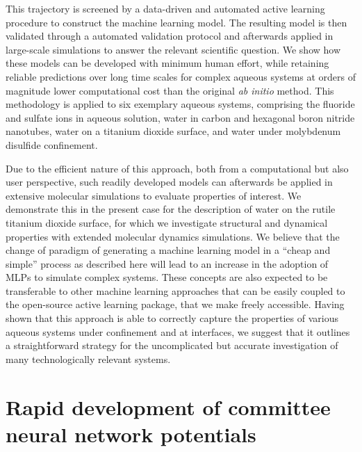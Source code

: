 \documentclass[aip,jcp,amsmath,amssymb,floatfix,reprint,citeautoscript,noeprint]{revtex4-1}
\begin{document}
\begin{bibunit}
%
This trajectory is screened by a data-driven and automated
active learning procedure to construct the machine learning model.
%
The resulting model is then validated through a automated validation protocol and afterwards applied in large-scale simulations to answer the relevant scientific question.
%
We show how these models
can be developed with minimum human effort, while
retaining reliable predictions over long time scales for complex aqueous systems
at orders of magnitude lower computational cost than the original
\textit{ab initio} method.
%
This methodology is applied to six exemplary aqueous systems,
comprising the fluoride and sulfate ions in aqueous solution,
water in carbon and hexagonal boron nitride nanotubes,
water on a titanium dioxide surface,
and water under molybdenum disulfide confinement.
%
%
%


%
%
%
%
%
%
%
%
%
%
%
%
%
%
%
%
%
%
%
%
%
%
%
%
%
%
%
%
%
%
%
%
%
%

%
Due to the efficient nature of this approach, both from
a computational but also user perspective,
such readily developed models can afterwards
be applied in extensive molecular simulations to evaluate properties of interest.
%
We demonstrate this in the present case for the
description of water on the rutile titanium dioxide surface,
for which we investigate structural and dynamical properties
with extended molecular dynamics simulations.
%
We believe that the
change of paradigm
of generating a machine learning model in a ``cheap and simple'' process
as described here
will lead to an increase in the adoption of MLPs to simulate complex systems.
%
These concepts are also expected to be transferable to other machine learning
approaches that can be easily coupled to the open-source
active learning package, that we make freely accessible.
%
Having shown that this approach is able to correctly capture
the properties of various aqueous systems
under confinement and at interfaces,
we suggest that it outlines a straightforward
strategy for the uncomplicated but accurate investigation
of many technologically relevant systems.

%
%
%
%
\section*{Rapid development of committee neural network potentials}
\label{sec:c-nnp}
%


\end{bibunit}
\end{document}
